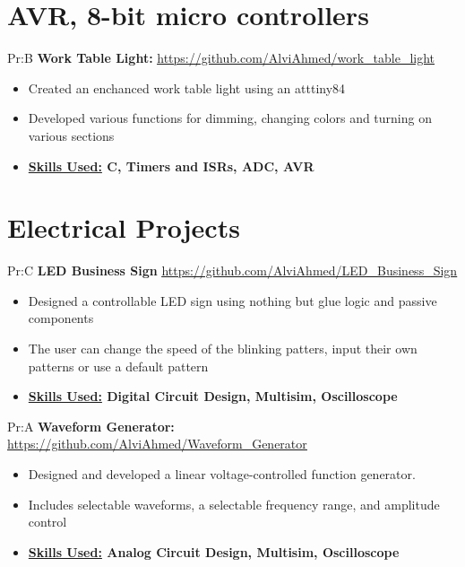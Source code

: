\begin{itemize}
\section*{AVR, 8-bit micro controllers}


Pr:B
\vspace{\spaces}
\textbf{Work Table Light: }
\underline{\url{https://github.com/AlviAhmed/work_table_light}}
\begin{itemize}[noitemsep,nolistsep]
\item Created an enchanced work table light using an atttiny84
\item Developed various functions for dimming, changing colors and turning on various sections 
\item \textbf{ \underline{Skills Used:} C, Timers and ISRs, ADC, AVR}
\end{itemize}


\section*{Electrical Projects}


Pr:C
\textbf{LED Business Sign}
\underline{\url{https://github.com/AlviAhmed/LED_Business_Sign}}
\begin{itemize}[noitemsep,nolistsep]
\item Designed a controllable LED sign using nothing but glue logic and passive components
\item The user can change the speed of the blinking patters, input their own patterns or
  use a default pattern
\item \textbf{ \underline{Skills Used:} Digital Circuit Design, Multisim, Oscilloscope}
\end{itemize}


Pr:A
\textbf{Waveform Generator: }
\underline{\url{https://github.com/AlviAhmed/Waveform_Generator}}
\begin{itemize}[noitemsep,nolistsep]
\item Designed and developed a linear voltage-controlled function generator. 
\item Includes selectable waveforms, a selectable frequency range, and amplitude control
\item \textbf{ \underline{Skills Used:} Analog Circuit Design, Multisim, Oscilloscope}
\end{itemize}            



\end{itemize}
